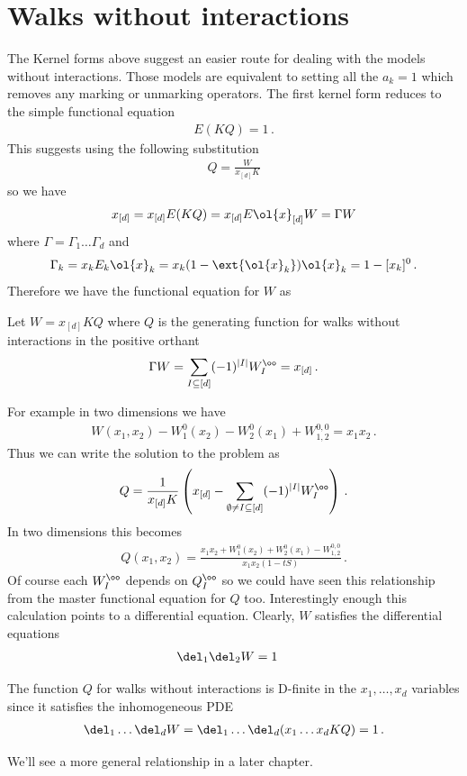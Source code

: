 \section{Walks without interactions}
The Kernel forms above suggest an easier route for dealing with the models without interactions. Those models are equivalent to setting all the $a_k =1$ which removes any marking or unmarking operators. The first kernel form reduces to the simple functional equation
\begin{align}
	 E(KQ) = 1\,.
\end{align}
This suggests using the following substitution
\begin{align}
	Q = \frac{W}{x_{[d]} K}
\end{align}
so we have
\begin{align}
	x_{[d]} = x_{[d]}E(KQ) = x_{[d]}E\ol{x}_{[d]}W = \Gamma W
\end{align}
where  $\Gamma = \Gamma_1\ldots\Gamma_d$ and 
\begin{align}
	\Gamma_k = x_kE_k\ol{x}_k = x_k(1-\ext{\ol{x}_k})\ol{x}_k = 1 - [x_k]^0\,.
\end{align}
Therefore we have the functional equation for $W$ as
\begin{prop} Let $W = x_{[d]}KQ$ where $Q$ is the generating function for walks without interactions in the positive orthant
\begin{align}
	\Gamma W = \sum_{I\subseteq [d]}(-1)^{|I|} W_I^\oo= x_{[d]}\,.
\end{align}
\end{prop}
For example in two dimensions we have
\begin{align}
	W(x_1,x_2) - W_1^0(x_2) -W_2^0(x_1) + W_{1,2}^{0,0} = x_1x_2\,.
\end{align}
Thus we can write the solution to the problem as
\begin{align}
	Q = \frac{1}{x_{[d]}K}\left(x_{[d]}-\sum_{\emptyset \neq I\subseteq [d]}(-1)^{|I|} W_I^\oo\right)\,.
\end{align}
In two dimensions this becomes
\begin{align}
	Q(x_1,x_2) = \frac{x_1x_2+W_1^0(x_2)+W_2^0(x_1)-W_{1,2}^{0,0}}{x_1x_2(1-tS)}\,.
\end{align}
Of course each $W_I^\oo$ depends on $Q_I^\oo$ so we could have seen this relationship from the master functional equation for $Q$ too.
Interestingly enough this calculation points to a differential equation. Clearly, $W$ satisfies the differential equations
\begin{align}
	\del_1\del_2 W &= 1
\end{align}
\begin{prop} The function $Q$ for walks without interactions is D-finite in the $x_1,\ldots,x_d$ variables since it satisfies the inhomogeneous PDE
\begin{align}
	\del_1\ldots\del_d W = \del_1\ldots\del_d (x_1\ldots x_d KQ) = 1\,.
\end{align}
\end{prop}
We'll see a more general relationship in a later chapter.

\endinput

